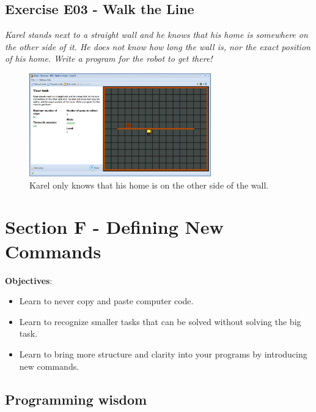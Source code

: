 \documentclass[article,A4,12pt]{llncs}
\begin{document}
\subsection{Exercise E03 - Walk the Line}

{\em Karel stands next to a straight wall and he knows that his home is somewhere on the other side of it. He does not know how long the wall is, nor the exact position of his home. Write a program for the robot to get there!}

\begin{figure}[!ht]
\begin{center}
\includegraphics[width=0.7\textwidth]{img/e03.png}
\end{center}
\vspace{-4mm}
\caption{Karel only knows that his home is on the other side of the wall.}
\label{fig:e03}
\vspace{-10mm}
\end{figure}
\noindent

\newpage

\section{Section F - Defining New Commands}

\noindent
{\bf Objectives}: 
\begin{itemize}
\item Learn to never copy and paste computer code.
\item Learn to recognize smaller tasks that can be solved without solving the big task.
\item Learn to bring more structure and clarity into your programs by introducing new commands.
\end{itemize}

\subsection{Programming wisdom}
\end{document}
